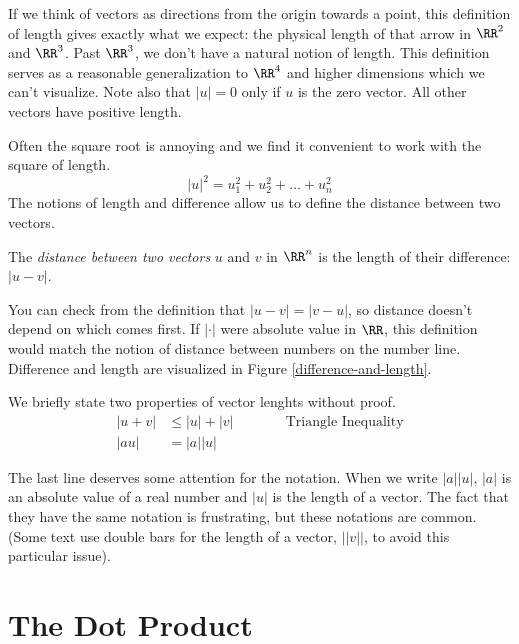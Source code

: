 \documentclass[fleqn]{report}
\begin{document}
If we think of vectors as directions from the origin towards a
point, this definition of length gives exactly what we expect:
the physical length of that arrow in $\RR^2$ and $\RR^3$.
Past $\RR^3$, we don't have a natural notion of length. This
definition serves as a reasonable generalization
to $\RR^4$ and higher dimensions which we can't
visualize. Note also that $|u| = 0$ only if $u$ is the zero
vector. All other vectors have positive length.

Often the square root is annoying and we find it convenient to
work with the square of length. 
\begin{equation*}
|u|^2 = u_1^2 + u_2^2 + \ldots + u_n^2
\end{equation*}
The notions of length and difference allow us to define the distance
between two vectors.

\begin{defn}
The \emph{distance between two vectors} $u$ and $v$ in $\RR^n$
is the length of their difference: $|u-v|$.
\end{defn}

You can check from the definition that $|u-v| = |v-u|$, so
distance doesn't depend on which comes first. If $|\cdot|$ were
absolute value in $\RR$, this definition would match the notion
of distance between numbers on the number line. 
Difference and length are visualized in Figure 
\ref{difference-and-length}. 

\begin{prop}
We briefly state two properties of vector lenghts without proof.
\begin{align*}
|u+v| & \leq |u| + |v| & \hspace{1cm} \ \text{ Triangle Inequality} \\
|au| & = |a||u| & 
\end{align*}
\end{prop}

The last line deserves some attention for the notation. When
we write $|a| |u|$, $|a|$ is an absolute value of a
real number and $|u|$ is the length of a vector. The fact
that they have the same notation is frustrating, but these
notations are common. (Some text use double bars for the
length of a vector, $||v||$, to avoid this particular issue). 

\section{The Dot Product}
\label{dot-product}
\end{document}
